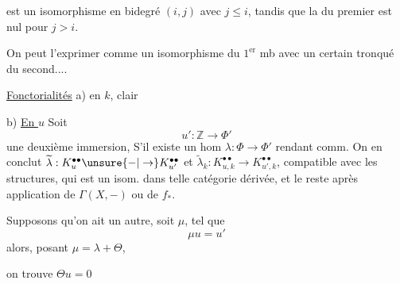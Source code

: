est un isomorphisme  en bidegré $(i,j)$ avec $j\leq i$, tandis que la  du premier  est nul pour $j>i$.

On peut l'exprimer comme un isomorphisme du $1^{\mathrm{er}}$ mb avec un certain tronqué du second....

\uline{Fonctorialités} a) en $k$, clair

b) \uline{En $u$}\deleted{\unsure{$\Phi$}} Soit
\[
u':\mathbb Z\longrightarrow\Phi'
\]
une deuxième immersion, S'il existe un hom $\lambda:\Phi\longrightarrow\Phi'$ rendant comm.
On en conclut $\widetilde\lambda:K_u^{\bullet\bullet}\unsure{\mathord{-}|\to}K_{u'}^{\bullet\bullet}$ et $\widetilde\lambda_k:K_{u,k}^{\bullet\bullet}\longrightarrow K_{u',k}^{\bullet\bullet}$, compatible avec  les structures, qui est un isom. dans telle catégorie dérivée, et le reste après application de $\Gamma(X,-)$ ou de $f_*$.

Supposons qu'on ait un autre, soit $\mu$, tel que
\[
\mu u=u'
\]
alors, posant $\mu=\lambda+\Theta$,

on trouve $\Theta u=0$
